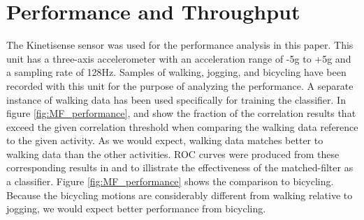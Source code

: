 \documentclass[journal]{IEEEtran}
\begin{document}
\section{Performance and Throughput}
%
The Kinetisense sensor was used for the performance analysis in this paper.
This unit has a three-axis accelerometer with an acceleration range of -5g to +5g and a sampling rate of 128Hz.
Samples of walking, jogging, and bicycling have been recorded with this unit for the purpose of analyzing the performance.
A separate instance of walking data has been used specifically for training the classifier.
In figure \ref{fig:MF_performance},  and  show the fraction of the correlation results that exceed the given correlation threshold when comparing the walking data reference to the given activity.
As we would expect, walking data matches better to walking data than the other activities.
ROC curves were produced from these corresponding results in  and  to illistrate the effectiveness of the matched-filter as a classifier.
Figure \ref{fig:MF_performance} shows the comparison to bicycling.
Because the bicycling motions are considerably different from walking relative to jogging, we would expect better performance from bicycling.
%
%
\end{document}
